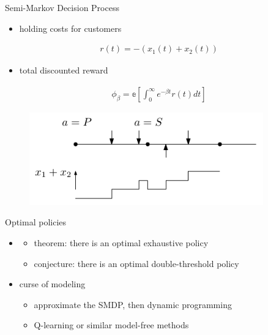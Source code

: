 \documentclass[bigger]{beamer}
\begin{document}
\begin{frame}[label={sec:org498ec01}]{Semi-Markov Decision Process}
\begin{itemize}
\item holding costs for customers
\end{itemize}

\begin{align}
r(t) = -(x_1(t) + x_2(t))
\end{align}

\begin{itemize}
\item total discounted reward
\end{itemize}

\begin{align}
\phi_\beta = \mathbb{e} \left[ \int_0^\infty e^{-\beta t}r(t) dt \right]
\end{align}

\vfill
\begin{figure}
  \centering
  \includegraphics[width=0.9\textwidth]{../figures/polling_smdp_rewards.pdf}
\end{figure}
\end{frame}
\begin{frame}[label={sec:org44f88f6}]{Optimal policies}
\begin{itemize}
\item \cite{hofriOptimalControlTwo1987}
\begin{itemize}
\item theorem: there is an optimal exhaustive policy
\item conjecture: there is an optimal double-threshold policy
\end{itemize}

\item curse of modeling
\begin{itemize}
\item approximate the SMDP, then dynamic programming
\item Q-learning or similar model-free methods
\end{itemize}
\end{itemize}
\end{frame}
\end{document}
